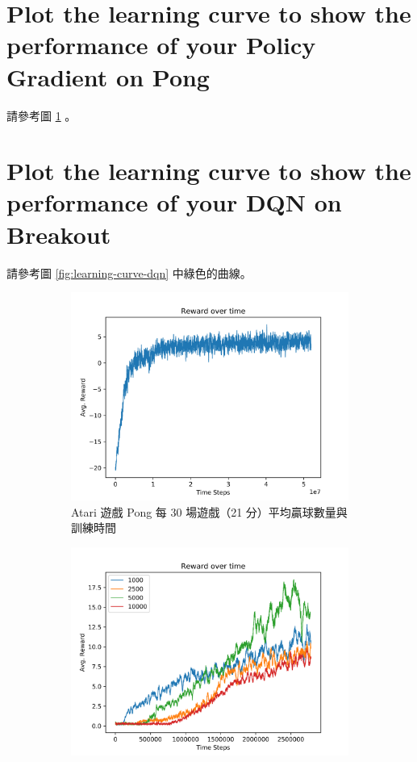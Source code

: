 \documentclass[fleqn,a4paper,12pt]{article}
\begin{document}
\section{Plot the learning curve to show the performance of your Policy Gradient on Pong}

請參考圖 \ref{fig:learning-curve-pg} 。

\section{Plot the learning curve to show the performance of your DQN on Breakout}

請參考圖 \ref{fig:learning-curve-dqn} 中綠色的曲線。

\begin{figure}[h]
\centering
\begin{subfigure}{.45\textwidth}
  \includegraphics[width=\linewidth]{figures/pg.png}
  \caption{Atari 遊戲 Pong 每 30 場遊戲（21 分）平均贏球數量與訓練時間}
  \label{fig:learning-curve-pg}
\end{subfigure}
\begin{subfigure}{.45\textwidth}
  \includegraphics[width=\linewidth]{figures/dqn-update-freq.png}

\end{subfigure}
\end{figure}
\end{document}
